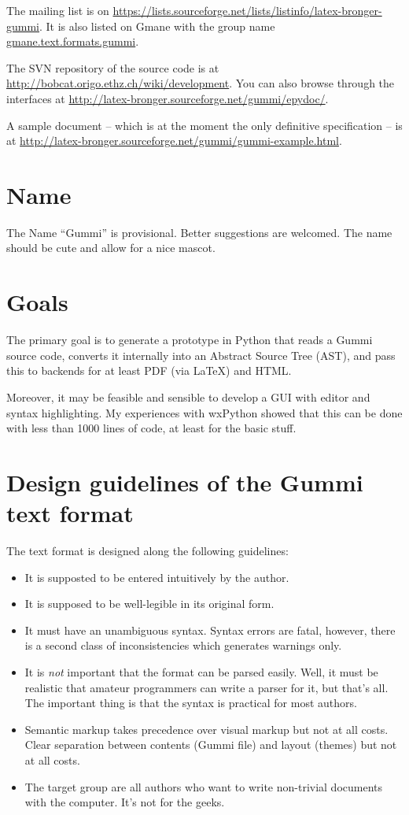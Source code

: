 \documentclass[12pt,openany]{book}
\begin{document}
The mailing list is on
\url{https://lists.sourceforge.net/lists/listinfo/latex-bronger-gummi}.  It is
also listed on Gmane with the group name \url{gmane.text.formats.gummi}.

The SVN repository of the source code is at
\url{http://bobcat.origo.ethz.ch/wiki/development}.  You can also browse through
the interfaces at \url{http://latex-bronger.sourceforge.net/gummi/epydoc/}.

A sample document -- which is at the moment the only definitive specification
-- is at
\url{http://latex-bronger.sourceforge.net/gummi/gummi-example.html}.

\section{Name}

The Name ``Gummi'' is provisional.  Better suggestions are welcomed.  The name
should be cute and allow for a nice mascot.


\section{Goals}

The primary goal is to generate a prototype in Python that reads a Gummi
source code, converts it internally into an Abstract Source Tree (AST), and
pass this to backends for at least PDF (via \LaTeX) and HTML\@.

Moreover, it may be feasible and sensible to develop a GUI with editor and
syntax highlighting.  My experiences with wxPython showed that this can be done
with less than 1000 lines of code, at least for the basic stuff.


\section{Design guidelines of the Gummi text format}

The text format is designed along the following guidelines:

\begin{itemize}
\item It is supposted to be entered intuitively by the author.
\item It is supposed to be well-legible in its original form.
\item It must have an unambiguous syntax.  Syntax errors are fatal, however,
  there is a second class of inconsistencies which generates warnings only.
\item It is \emph{not} important that the format can be parsed easily.  Well,
  it must be realistic that amateur programmers can write a parser for it, but
  that's all.  The important thing is that the syntax is practical for most
  authors.
\item Semantic markup takes precedence over visual markup but not at all costs.
  Clear separation between contents (Gummi file) and layout (themes) but not at
  all costs.
\item The target group are all authors who want to write non-trivial documents
  with the computer.  It's not for the geeks.
\end{itemize}
\end{document}
